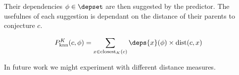 Their dependencies $\phi \in \depset$ are then suggested by the predictor.
The usefulnes of each suggestion is dependant on the distance of their parents to conjecture $c$.
\begin{definition}
  $$
    P^K_\text{knn}(c, \phi) = \sum_{x \in \text{closest}_K(c)} \deps{x}(\phi) \times \text{dist}(c, x)
  $$
\end{definition}

In future work we might experiment with different distance measures.

